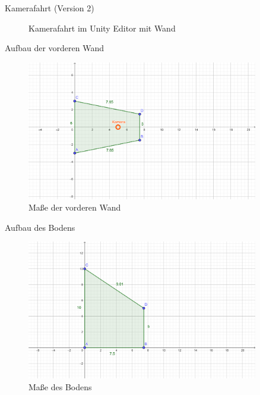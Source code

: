 \documentclass{beamer}
\begin{document}
\begin{frame}{Kamerafahrt (Version 2)}
\begin{figure}
    \centering
\caption{Kamerafahrt im Unity Editor mit Wand}
\end{figure}
\end{frame}


\begin{frame}{Aufbau der vorderen Wand}
\begin{figure}
    \centering
\includegraphics[width=0.9\textwidth, keepaspectratio]{img/geogebra-export_Vorderseite}
\caption{Maße der vorderen Wand}
\end{figure}
\end{frame}


\begin{frame}{Aufbau des Bodens}
\begin{figure}
    \centering
\includegraphics[width=0.9\textwidth, keepaspectratio]{img/geogebra-export_Boden}
\caption{Maße des Bodens}
\end{figure}
\end{frame}
\end{document}

